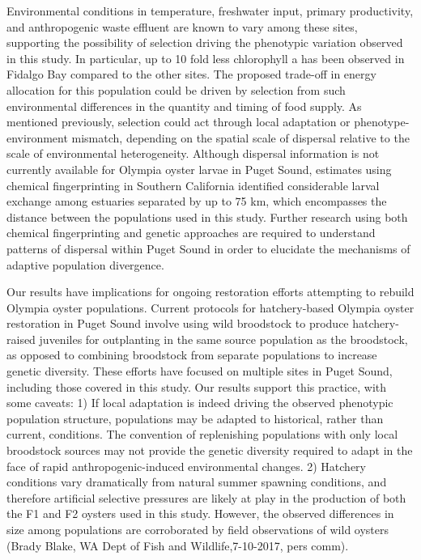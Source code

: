 \documentclass[10pt,letterpaper]{article}
\begin{document}
Environmental conditions in temperature, freshwater input, primary productivity, and anthropogenic waste effluent are known to vary among these sites\cite{Heare2017-uv}, supporting the possibility of selection driving the phenotypic variation observed in this study. In particular, up to 10 fold less chlorophyll a has been observed in Fidalgo Bay compared to the other sites. The proposed trade-off in energy allocation for this population could be driven by selection from such environmental differences in the quantity and timing of food supply\cite{Heino1999-fb,Pontarp2015-oc}. As mentioned previously, selection could act through local adaptation or phenotype-environment mismatch, depending on the spatial scale of dispersal relative to the scale of environmental heterogeneity. Although dispersal information is not currently available for Olympia oyster larvae in Puget Sound, estimates using chemical fingerprinting in Southern California identified considerable larval exchange among estuaries separated by up to 75 km\cite{Carson2010-xi}, which encompasses the distance between the populations used in this study. Further research using both chemical fingerprinting and genetic approaches are required to understand patterns of dispersal within Puget Sound in order to elucidate the mechanisms of adaptive population divergence.\par
Our results have implications for ongoing restoration efforts attempting to rebuild Olympia oyster populations. Current protocols for hatchery-based Olympia oyster restoration in Puget Sound involve using wild broodstock to produce hatchery-raised juveniles for outplanting in the same source population as the broodstock\cite{Blake2012-ln}, as opposed to combining broodstock from separate populations to increase genetic diversity. These efforts have focused on multiple sites in Puget Sound, including those covered in this study. Our results support this practice, with some caveats: 1) If local adaptation is indeed driving the observed phenotypic population structure, populations may be adapted to historical, rather than current, conditions. The convention of replenishing populations with only local broodstock sources may not provide the genetic diversity required to adapt in the face of rapid anthropogenic-induced environmental changes\cite{Jones2013-pe}. 2) Hatchery conditions vary dramatically from natural summer spawning conditions, and therefore artificial selective pressures are likely at play in the production of both the F1 and F2 oysters used in this study\cite{McClure2008-al}. However, the observed differences in size among populations are corroborated by field observations of wild oysters (Brady Blake, WA Dept of Fish and Wildlife,7-10-2017, pers comm).\par
\end{document}
